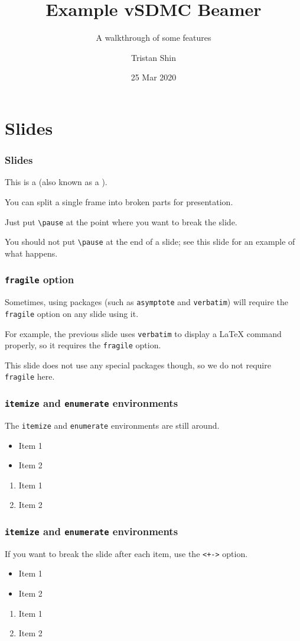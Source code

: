 \documentclass[mathserif]{beamer}
\title[vSDMC Example]{Example vSDMC Beamer}
\subtitle{A walkthrough of some features}
\author{Tristan Shin}
\date{25 Mar 2020}
\begin{document}
\frame{\titlepage}

\section{Slides}

\begin{frame}[fragile]\frametitle{Slides}
	This is a  (also known as a ).
	\pause
	
	You can split a single frame into broken parts for presentation.
	\pause
	
	Just put \verb|\pause| at the point where you want to break the slide.
	\pause
	
	You should not put \verb|\pause| at the end of a slide; see this slide for an example of what happens.
	\pause
\end{frame}

\begin{frame}\frametitle{\texttt{fragile} option}
	Sometimes, using packages (such as \texttt{asymptote} and \texttt{verbatim}) will require the \texttt{fragile} option on any slide using it.
	\pause
	
	For example, the previous slide uses \texttt{verbatim} to display a LaTeX command properly, so it requires the \texttt{fragile} option.
	\pause
	
	This slide does not use any special packages though, so we do not require \texttt{fragile} here.
\end{frame}

\begin{frame}\frametitle{\texttt{itemize} and \texttt{enumerate} environments}
	The \texttt{itemize} and \texttt{enumerate} environments are still around.
	\begin{itemize}
		\item Item 1
		\item Item 2
	\end{itemize}
	\begin{enumerate}
		\item Item 1
		\item Item 2
	\end{enumerate}
\end{frame}

\begin{frame}\frametitle{\texttt{itemize} and \texttt{enumerate} environments}
	If you want to break the slide after each item, use the \texttt{<+->} option.
	\pause
	\begin{itemize}[<+->]
		\item Item 1
		\item Item 2
	\end{itemize}
	\begin{enumerate}[<+->]
		\item Item 1
		\item Item 2
	\end{enumerate}
\end{frame}
\end{document}
